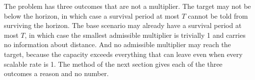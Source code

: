 The problem has three outcomes that are not a multiplier. The target may not be below the horizon, in which case a survival period at most $T$ cannot be told from surviving the horizon. The base scenario may already have a survival period at most $T$, in which case the smallest admissible multiplier is trivially 1 and carries no information about distance. And no admissible multiplier may reach the target, because the capacity exceeds everything that can leave even when every scalable rate is 1. The method of the next section gives each of the three outcomes a reason and no number.
